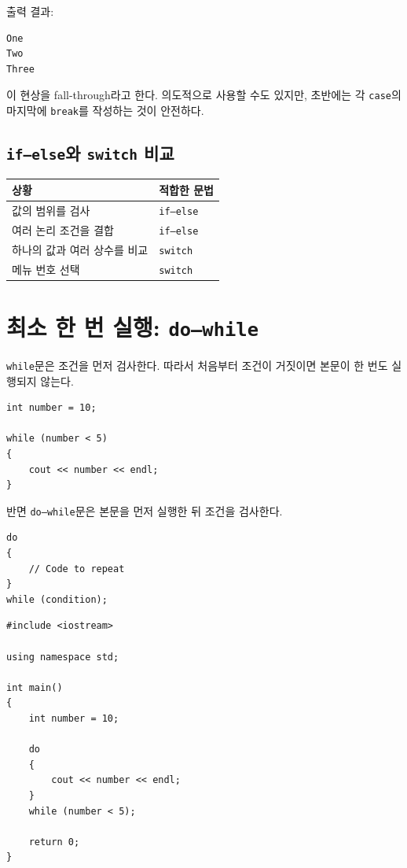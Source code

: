 \documentclass[11pt,a4paper]{article}
\begin{document}
출력 결과:

\begin{verbatim}
One
Two
Three
\end{verbatim}

이 현상을 fall-through라고 한다.
의도적으로 사용할 수도 있지만, 초반에는 각 \texttt{case}의 마지막에
\texttt{break}를 작성하는 것이 안전하다.

\subsection{\texttt{if--else}와 \texttt{switch} 비교}

\begin{center}
\begin{tabular}{ll}
\toprule
상황 & 적합한 문법 \\
\midrule
값의 범위를 검사 & \texttt{if--else} \\
여러 논리 조건을 결합 & \texttt{if--else} \\
하나의 값과 여러 상수를 비교 & \texttt{switch} \\
메뉴 번호 선택 & \texttt{switch} \\
\bottomrule
\end{tabular}
\end{center}

\section{최소 한 번 실행: \texttt{do--while}}

\texttt{while}문은 조건을 먼저 검사한다.
따라서 처음부터 조건이 거짓이면 본문이 한 번도 실행되지 않는다.

\begin{lstlisting}
int number = 10;

while (number < 5)
{
    cout << number << endl;
}
\end{lstlisting}

반면 \texttt{do--while}문은 본문을 먼저 실행한 뒤 조건을 검사한다.

\begin{lstlisting}
do
{
    // Code to repeat
}
while (condition);
\end{lstlisting}

\begin{lstlisting}
#include <iostream>

using namespace std;

int main()
{
    int number = 10;

    do
    {
        cout << number << endl;
    }
    while (number < 5);

    return 0;
}
\end{lstlisting}
\end{document}
